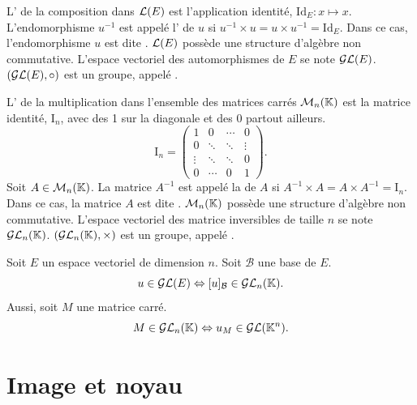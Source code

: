 \documentclass{book}
\begin{document}
\begin{Definition}
L' de la composition dans $\LE$ est l'application identité, $\mathrm {Id}_{E}:x\mapsto x$. L'endomorphisme $u^{-1}$ est appelé l'  de $u$ si $ u^{-1}×u=u×u^{-1}=\mathrm {Id}_{E}$. Dans ce cas, l'endomorphisme $u$ est dite .  $\LE$ possède une structure d'algèbre non commutative. L'espace vectoriel des automorphismes de $E$ se note $ \GLE$.   $(\GLE,\circ)$ est un groupe, appelé .
\end{Definition}
\begin{Definition}
L' de la multiplication dans l'ensemble des matrices carrés $\MnK$ est la matrice identité, $\mathrm {I} _{n}$, avec des 1 sur la diagonale et des 0 partout ailleurs.  
$$ \mathrm {I} _{n}=\begin{pmatrix}1&0&\cdots &0\\0&\ddots &\ddots &\vdots \\\vdots &\ddots &\ddots &0\\0&\cdots &0&1\end{pmatrix}.$$Soit $A\in\MnK$. La matrice $A^{-1}$ est appelé la  de $A$ si $ A^{-1}×A=A×A^{-1}= \mathrm {I} _{n}$. Dans ce cas, la matrice $A$ est dite .  $\MnK$ possède une structure d'algèbre non commutative. L'espace vectoriel des matrice inversibles de taille $n$ se note $\GLnK$.   $(\GLnK,\times)$ est un groupe, appelé .  
\end{Definition}
\begin{Proposition}[Dualité]
Soit $E$ un espace vectoriel de dimension $n$. Soit $\mathcal{B}$ une base de $E$.\\
$$u\in\GLE\Leftrightarrow [u]_\mathcal{B}\in \GLnK.$$
Aussi, soit $M$ une matrice carré.
$$M \in \GLnK \Leftrightarrow u_M\in \GLE[\K^n] .$$
\end{Proposition}
\section{Image et noyau}
\end{document}
